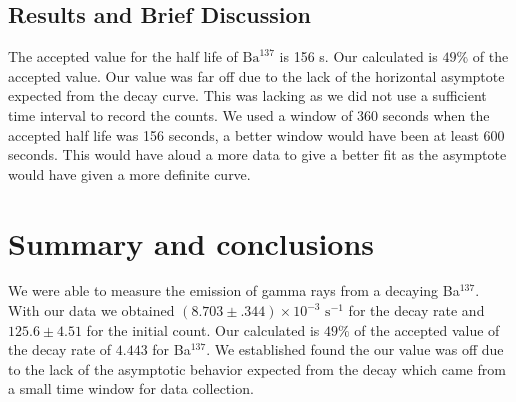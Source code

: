 \documentclass[11pt,letterpaper,onecolumn]{article}
\begin{document}
\subsection{Results and Brief Discussion}

The accepted value for the half life of $\text{Ba}^{137}$ is 156 s. Our calculated is $49\%$ of the accepted value. Our value was far off due to the lack of the horizontal asymptote expected from the decay curve. This was lacking as we did not use a sufficient time interval to record the counts. We used a window of 360 seconds when the accepted half life was 156 seconds, a better window would have been at least 600 seconds. This would have aloud a more data to give a better fit as the asymptote would have given a more definite curve.  



\section{Summary and conclusions}

We were able to measure the emission of gamma rays from a decaying Ba$^{137}$. With our data we obtained $(8.703\pm.344)\times10^{-3} \text{ s}^{-1}$ for the decay rate and  $125.6\pm4.51$ for the initial count. Our calculated is $49\%$ of the accepted value of the decay rate of $4.443$ for Ba$^{137}$. We established found the our value was off due to the lack of the asymptotic behavior expected from the decay which came from a small time window for data collection.

\end{document}
